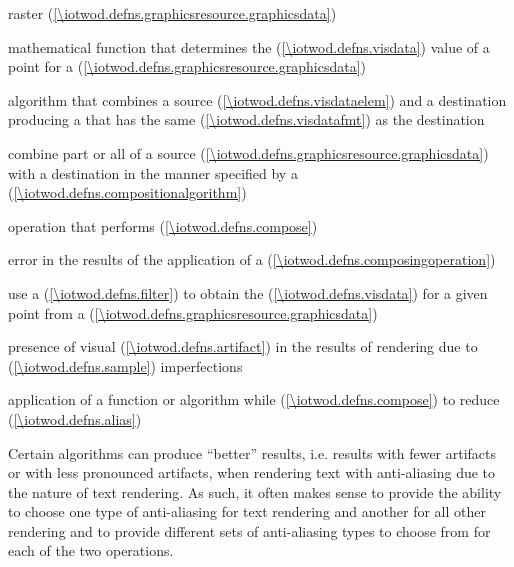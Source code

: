 \indexdefn{\pixmap}%
raster  (\ref{\iotwod.defns.graphicsresource.graphicsdata})

%
mathematical function that determines the  (\ref{\iotwod.defns.visdata}) value of a point for a  (\ref{\iotwod.defns.graphicsresource.graphicsdata})

%
algorithm that combines a source  (\ref{\iotwod.defns.visdataelem}) and a destination  producing a  that has the same  (\ref{\iotwod.defns.visdatafmt}) as the destination 

%
combine part or all of a source  (\ref{\iotwod.defns.graphicsresource.graphicsdata}) with a destination  in the manner specified by a  (\ref{\iotwod.defns.compositionalgorithm})

%
operation that performs  (\ref{\iotwod.defns.compose})

%
error in the results of the application of a  (\ref{\iotwod.defns.composingoperation})

%
use a  (\ref{\iotwod.defns.filter}) to obtain the  (\ref{\iotwod.defns.visdata}) for a given point from a  (\ref{\iotwod.defns.graphicsresource.graphicsdata})

%
presence of visual  (\ref{\iotwod.defns.artifact}) in the results of rendering due to  (\ref{\iotwod.defns.sample}) imperfections

%
application of a function or algorithm while  (\ref{\iotwod.defns.compose}) to reduce  (\ref{\iotwod.defns.alias})
\begin{note}
Certain algorithms can produce ``better'' results, i.e. results with fewer artifacts or with less pronounced artifacts, when rendering text with anti-aliasing due to the nature of text rendering. As such, it often makes sense to provide the ability to choose one type of anti-aliasing for text rendering and another for all other rendering and to provide different sets of anti-aliasing types to choose from for each of the two operations.
\end{note}

